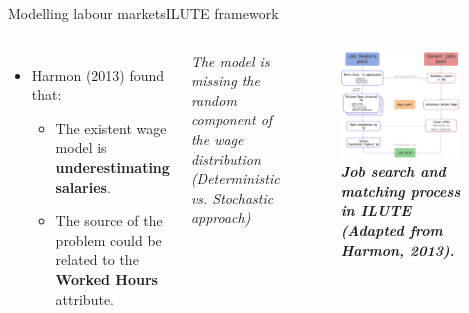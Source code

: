 \documentclass[aspectratio=169, xcolor=dvipsnames]{beamer}
\begin{document}
\begin{frame}{Modelling labour markets}{ILUTE framework}
    \vspace*{-25pt}
    \begin{columns}
            \begin{itemize}
                \setlength{\itemsep}{10pt} %
                \item \fontsize{10pt}{12pt}\selectfont Harmon (2013) found that:
                \begin{itemize}
                    \item \fontsize{10pt}{12pt}\selectfont The existent wage model is \textbf{underestimating salaries}. 
                    \item \fontsize{10pt}{12pt}\selectfont The source of the problem could be related to the \textbf{Worked Hours} attribute.
                \end{itemize}
            \end{itemize}
            \vspace{15pt}
            \centering
            \textit{The model is missing the random component of the wage distribution (Deterministic vs. Stochastic approach)}
            \begin{figure}
                \centering
                \includegraphics[width=0.9\textwidth]{./images/job_matching.png}
                \captionsetup{labelformat=empty}
                \caption{\fontsize{8pt}{8pt}\selectfont \textbf{\textit{Job search and matching process in ILUTE (Adapted from Harmon,
                2013).}}}
            \end{figure}
    \end{columns}
\end{frame}
\end{document}
